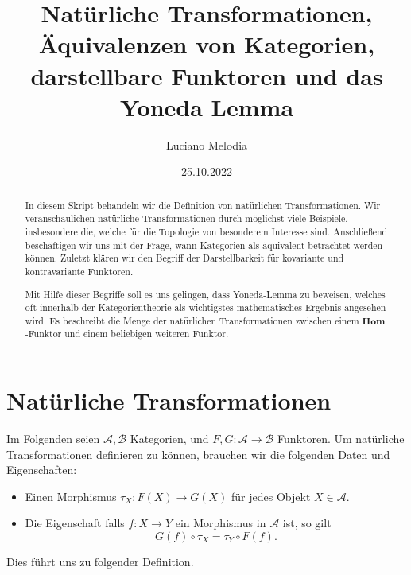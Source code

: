 \documentclass{article}
\title{Natürliche Transformationen, Äquivalenzen von Kategorien, darstellbare Funktoren und das Yoneda Lemma}
\author{Luciano Melodia}
\date{25.10.2022}
\theoremstyle{plain}
\theoremstyle{definition}
\theoremstyle{remark}
\begin{document}
\maketitle

\begin{abstract}
In diesem Skript behandeln wir die Definition von natürlichen Transformationen. Wir veranschaulichen natürliche Transformationen durch möglichst viele Beispiele, insbesondere die, welche für die Topologie von besonderem Interesse sind. Anschließend beschäftigen wir uns mit der Frage, wann Kategorien als äquivalent betrachtet werden können. Zuletzt klären wir den Begriff der Darstellbarkeit für kovariante und kontravariante Funktoren.

Mit Hilfe dieser Begriffe soll es uns gelingen, dass Yoneda-Lemma zu beweisen, welches oft innerhalb der Kategorientheorie als wichtigstes mathematisches Ergebnis angesehen wird. Es beschreibt die Menge der natürlichen Transformationen zwischen einem $\textbf{Hom}$-Funktor und einem beliebigen weiteren Funktor.
\end{abstract}
\section{Natürliche Transformationen}
Im Folgenden seien $\mathcal{A},\mathcal{B}$ Kategorien, und $F,G: \mathcal{A} \rightarrow \mathcal{B}$ Funktoren. Um natürliche Transformationen definieren zu können, brauchen wir die folgenden Daten und Eigenschaften:
\begin{itemize}
	\item Einen Morphismus $\tau_{X}: F(X) \rightarrow G(X)$ für jedes Objekt $X \in \mathcal{A}$.
	\item Die Eigenschaft falls $f: X \rightarrow Y$ ein Morphismus in $\mathcal{A}$ ist, so gilt
	\begin{equation}
		G(f) \circ \tau_{X} = \tau_{Y} \circ F(f).
	\end{equation}
\end{itemize}
Dies führt uns zu folgender Definition.
\end{document}
